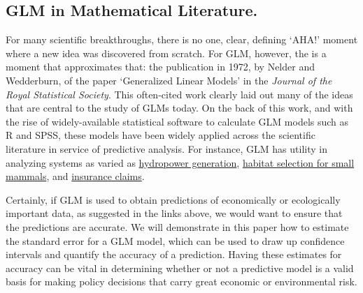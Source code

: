 \documentclass[12pt]{article}
\begin{document}

	\subsection{GLM in Mathematical Literature.}
		For many scientific breakthroughs, there is no one, clear, defining `AHA!' moment where a new idea was discovered from scratch. For
GLM, however, the is a moment that approximates that: the publication in 1972, by Nelder and Wedderburn, of the paper `Generalized Linear Models'
in the \textit{Journal of the Royal Statistical Society}.  This often-cited work clearly laid out many of the ideas that are central to the study 
of GLMs today.  On the back of this work, and with the rise of widely-available statistical software to calculate GLM models such as R and SPSS, 
these models have been widely applied across the scientific literature in service of predictive analysis.  For instance, GLM has utility in
analyzing systems as varied as 
\href{https://www.sciencedirect.com/science/article/pii/S037877961630222X}{hydropower generation}, 
\href{https://www.sciencedirect.com/science/article/pii/S1470160X17306271}{habitat selection for small mammals}, and 
\href{https://www.sciencedirect.com/science/article/pii/S0167668715303358}{insurance claims}.  

Certainly, if GLM is used to obtain predictions of economically or ecologically important data, as suggested in the links above, we would want to 
ensure that the predictions are accurate. We will demonstrate in this paper how to estimate the standard error for a GLM model, which can be 
used to draw up confidence intervals and quantify the accuracy of a prediction.  Having these estimates for accuracy can be vital in determining
whether or not a predictive model is a valid basis for making policy decisions that carry great economic or environmental risk.

\end{document}
